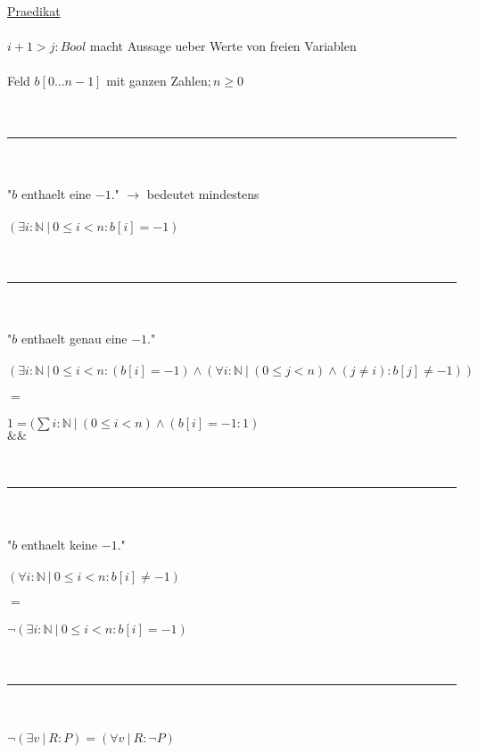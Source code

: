 \documentclass[18pt,a4paper]{article}
\newcommand{\tab}{\hspace*{2em}}
\begin{document}
\uline{Praedikat}\\
\\
$i+1 > j : Bool$ macht Aussage ueber Werte von freien Variablen\\
\\
Feld $b[0...n-1]$ mit ganzen Zahlen$; n\geqslant 0$\\
\\
\\
\rule{\textwidth}{0.4mm}\\
\\
"$b$ enthaelt eine $-1$." $\rightarrow$ bedeutet mindestens\\
\\
$(\exists{i} : \mathbb{N} \:\vert\: 0\leqslant i < n : b[i] = -1)$\\
\\
\\
\rule{\textwidth}{0.4mm}\\
\\
"$b$ enthaelt genau eine $-1$."\\
\\
$(\exists{i} : \mathbb{N} \:\vert\: 0\leqslant i < n : (b[i] = -1) \wedge (\forall{i} : \mathbb{N} \:\vert\: (0\leqslant j < n) \wedge (j\neq i) : b[j] \neq -1 ))$\\
\\
$=$\\
\\
$1 = (\sum{i} : \mathbb{N} \:\vert\: (0\leqslant i < n) \wedge (b[i] = -1 : 1)$\\
\tab \tab \tab \tab \tab \:\:\:$\&\&$\\
\\
\\
\rule{\textwidth}{0.4mm}\\
\\
"$b$ enthaelt keine $-1$."\\
\\
$(\forall{i} : \mathbb{N} \:\vert\: 0\leqslant i < n : b[i] \neq -1)$\\
\\
$=$\\
\\
$\neg (\exists{i} : \mathbb{N} \:\vert\: 0\leqslant i < n : b[i] = -1)$\\
\\
\\
\rule{\textwidth}{0.4mm}\\
\\
$\neg (\exists{v} \:\vert\: R : P) = (\forall{v} \:\vert\: R : \neg P)$\\
\end{document}
